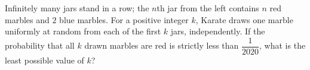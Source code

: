 Infinitely many jars stand in a row; the $n$th jar from the left contains $n$ red marbles and $2$ blue marbles. For a positive integer $k$, Karate draws one marble uniformly at random from each of the first $k$ jars, independently. If the probability that all $k$ drawn marbles are red is strictly less than $\dfrac{1}{2020}$, what is the least possible value of $k$?
